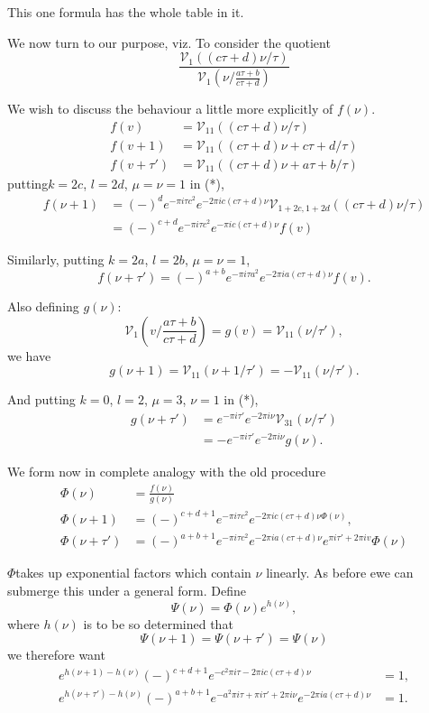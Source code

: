 This one formula has the whole table in it.

We now turn to our purpose, viz. To consider the quotient
$$
\frac{\mathscr{V}_1 ((c \tau+d)\nu/\tau)}{\mathscr{V}_1 \left(\nu \Big/
  \frac{a \tau+b}{c \tau +d}\right)}
$$

We wish to discuss the behaviour a little more explicitly of $f(\nu)$.
\begin{align*}
  f(v) & = \mathscr{V}_{11} ((c \tau+d) \nu/\tau)\\
  f(v+1) & = \mathscr{V}_{11} ((c \tau +d)\nu + c\tau +d/\tau)\\
  f(v+\tau') & = \mathscr{V}_{11} ((c \tau +d)\nu + a \tau + b/ \tau)
\end{align*}
putting\pageoriginale $k=2c$, $l=2d$, $\mu=\nu=1$ in (*), 
\begin{align*}
  f(\nu+1) & = (-)^d e^{-\pi i \tau c^2} e^{-2 \pi i c(c \tau + d)\nu}
  \mathscr{V}_{1+2c, 1+2d} ((c\tau+d)\nu /\tau)\\
  & = (-)^{c+d} e^{-\pi i \tau c^2} e^{-\pi i c(c \tau +d)\nu} f(v)
\end{align*}

Similarly, putting $k = 2a$, $l= 2b$, $\mu=\nu=1$, 
$$
f(\nu + \tau') = (-)^{a+b} e^{- \pi i \tau a^2} e^{-2 \pi i a (c \tau
  + d) \nu} f(v).
$$

Also defining $g(\nu)$:
$$
\mathscr{V}_1 \left(v\Big/\frac{a \tau + b}{c \tau +d} \right) = g(v)
= \mathscr{V}_{11} (\nu/\tau'),
$$
we have
$$
g(\nu+1) = \mathscr{V}_{11} (\nu + 1/\tau')=- \mathscr{V}_{11} (\nu/ \tau').
$$

And putting $k=0$, $l=2$, $\mu=3$, $\nu=1$ in (*),
\begin{align*}
  g(\nu+ \tau') & = e^{- \pi i \tau'} e^{- 2 \pi i \nu}
    \mathscr{V}_{31} (\nu/\tau')\\
    & = - e^{- \pi i \tau'} e^{-2 \pi i \nu} g(\nu).
\end{align*}

We form now in complete analogy with the old procedure
\begin{align*}
 \Phi (\nu) & = \frac{f(\nu)}{g(\nu)}\\
 \Phi (\nu+1) & = (-)^{c+d+1} e^{- \pi i \tau c^2} e^{-2 \pi i c(c
   \tau + d)\nu \Phi (\nu)},\\
 \Phi (\nu + \tau') & = (-)^{a+b+1} e^{- \pi i \tau c^2} e^{- 2\pi i a
 (c \tau+d)\nu} e^{\pi i \tau' + 2 \pi i v} \Phi (\nu)
\end{align*}

$\Phi$\pageoriginale takes up exponential factors which contain $\nu$
linearly. As before ewe can submerge this under a general form. Define 
$$
\Psi (\nu) = \Phi (\nu) e^{h(\nu)},
$$
where $h(\nu)$ is to be so determined that
$$
\Psi (\nu+1) = \Psi (\nu + \tau') = \Psi (\nu)
$$
we therefore want
\begin{align*}
  e^{h(\nu+1)- h(\nu)} (-)^{c+d+1} e^{-c^2 \pi i \tau -2 \pi i c(c\tau
    +d)\nu}& =1,\\
  e^{h(\nu+\tau')- h(\nu)} (-)^{a+b+1} e^{-a^2 \pi i \tau + \pi i
    \tau'+ 2 \pi i \nu} e^{- 2 \pi i a (c\tau +d)\nu} & =1.  
\end{align*}

